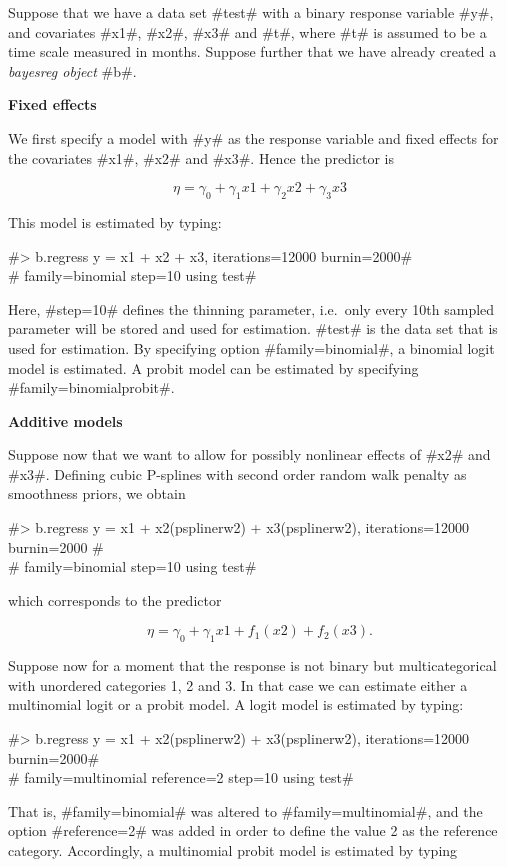 Suppose that we have a data set #test# with a binary response
variable #y#, and covariates  #x1#, #x2#, #x3#  and #t#, where #t#
is assumed to be a time scale measured in months. Suppose further
that we have already created a {\em bayesreg object} #b#.

{\bf  Fixed effects}
\medskip

We first specify a model with #y# as the response variable and
fixed effects for the covariates #x1#, #x2# and #x3#. Hence the
predictor is

$$
\eta = \gamma_0 + \gamma_1 x1 + \gamma_2 x2 + \gamma_3 x3
$$

This model is estimated by typing:

#> b.regress y = x1 + x2 + x3, iterations=12000 burnin=2000# \\
#  family=binomial step=10 using test#

Here, #step=10# defines the thinning parameter, i.e.~only every
10th sampled parameter will be stored and used for estimation.
#test# is the data set that is used for estimation. By specifying
option #family=binomial#, a binomial logit model is estimated. A
probit model can be estimated by specifying
#family=binomialprobit#.

{\bf Additive models}
\medskip

Suppose now that we want to allow for possibly nonlinear effects
of #x2# and #x3#. Defining cubic P-splines with second order
random walk penalty as smoothness priors, we obtain

#> b.regress y = x1 + x2(psplinerw2) + x3(psplinerw2), iterations=12000 burnin=2000 #\\
#  family=binomial step=10 using test#

which corresponds to the predictor

$$
\eta = \gamma_0 + \gamma_1 x1 + f_1(x2) + f_2(x3).
$$

Suppose now for a moment that the response is not binary but
multicategorical with unordered categories 1, 2 and 3. In that
case we can estimate either a multinomial logit or a probit model.
A logit model is estimated by typing:

#> b.regress y = x1 + x2(psplinerw2) + x3(psplinerw2), iterations=12000 burnin=2000# \\
#  family=multinomial reference=2 step=10 using test#

That is, #family=binomial# was altered to #family=multinomial#,
and the option #reference=2# was added in order to define the
value 2 as the reference category. Accordingly, a multinomial
probit model is estimated by typing

